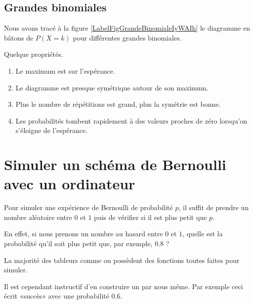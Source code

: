 \subsection{Grandes binomiales}

Nous avons tracé à la figure \ref{LabelFigGrandeBinomialeIyWAIh} le diagramme en bâtons de \( P(X=k)\) pour différentes grandes binomiales.
\newcommand{\CaptionFigGrandeBinomialeIyWAIh}{Quelque grandes binomiales.}


Quelque propriétés.
\begin{enumerate}
    \item
        Le maximum est sur l'espérance.
    \item
        Le diagramme est presque symétrique autour de son maximum.
    \item
        Plus le nombre de répétitions est grand, plus la symétrie est bonne.
    \item
        Les probabilités tombent rapidement à des valeurs proches de zéro lorsqu'on s'éloigne de l'espérance.
\end{enumerate}
    

\section{Simuler un schéma de Bernoulli avec un ordinateur}

Pour simuler une expérience de Bernoulli de probabilité \( p\), il suffit de prendre un nombre aléatoire entre \( 0\) et \( 1\) puis de vérifier si il est plus petit que \( p\).

En effet, si nous prenons un nombre au hasard entre \( 0\) et \( 1\), quelle est la probabilité qu'il soit plus petit que, par exemple, \( 0.8\) ?

La majorité des tableurs comme  ou  possèdent des fonctions toutes faites pour simuler.

Il est cependant instructif d'en construire un par nous même. Par exemple ceci écrit «succès» avec une probabilité \( 0.6\).


